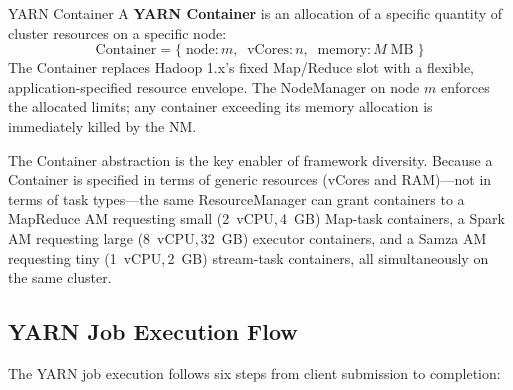 \begin{defbox}{YARN Container}
A \textbf{YARN Container} is an allocation of a specific quantity of
cluster resources on a specific node:
\[
\text{Container} = \bigl\{\;\text{node} : m,\;\; \text{vCores} : n,\;\;
                           \text{memory} : M\;\text{MB}\;\bigr\}
\]
The Container replaces Hadoop 1.x's fixed Map/Reduce slot with a
flexible, application-specified resource envelope. The NodeManager
on node $m$ enforces the allocated limits; any container exceeding
its memory allocation is immediately killed by the NM.
\end{defbox}

The Container abstraction is the key enabler of framework diversity.
Because a Container is specified in terms of generic resources (vCores
and RAM)---not in terms of task types---the same Resource\-Manager can
grant containers to a MapReduce AM requesting small (2~vCPU,\,4~GB)
Map-task containers, a Spark AM requesting large (8~vCPU,\,32~GB)
executor containers, and a Samza AM requesting tiny (1~vCPU,\,2~GB)
stream-task containers, all simultaneously on the same cluster.

\subsection{YARN Job Execution Flow}
\label{subsec:yarn-flow}

The YARN job execution follows six steps from client submission to
completion:


